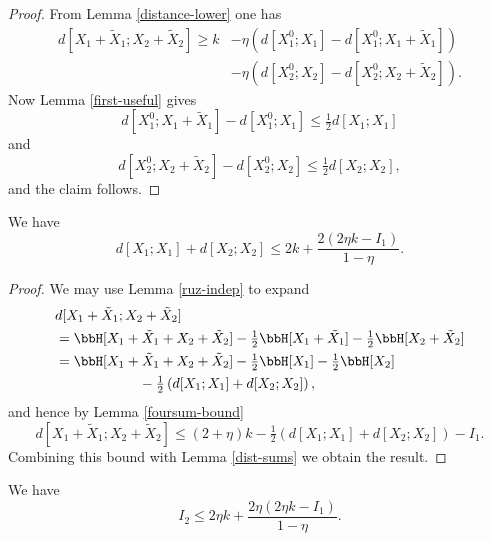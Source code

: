 \begin{proof}\leanok From Lemma \ref{distance-lower} one has
\begin{align*}
    d[X_1+\tilde X_1; X_2+\tilde X_2] \geq k &- \eta(d[X^0_1;X_1] - d[X^0_1;X_1+\tilde X_1]) \\
    &- \eta(d[X^0_2;X_2] - d[X^0_2;X_2+\tilde X_2]).
\end{align*}
Now Lemma \ref{first-useful} gives
$$
d[X^0_1;X_1+\tilde X_1] - d[X^0_1;X_1] \leq \tfrac{1}{2} d[X_1;X_1]$$
and
$$
  d[X^0_2;X_2+\tilde X_2] - d[X^0_2;X_2] \leq \tfrac{1}{2} d[X_2;X_2],
$$
and the claim follows.
\end{proof}

\begin{lemma}\label{second-estimate-aux}\leanok
We have
\[d[X_1;X_1] + d[X_2;X_2] \leq 2 k + \frac{2(2 \eta k - I_1)}{1-\eta}. \]
\end{lemma}
\begin{proof}
\leanok
We may use Lemma \ref{ruz-indep} to expand
  \begin{align*}
   & d[X_1+\tilde X_1;X_2+\tilde X_2] \\ &= \bbH[X_1+\tilde X_1 + X_2 + \tilde X_2]  - \tfrac{1}{2} \bbH[X_1+\tilde X_1] - \tfrac{1}{2} \bbH[X_2+\tilde X_2] \\
    &= \bbH[X_1+\tilde X_1 + X_2 + \tilde X_2]  - \tfrac{1}{2} \bbH[X_1] - \tfrac{1}{2} \bbH[X_2]  \\ & \qquad\qquad\qquad   - \tfrac{1}{2} \left( d[X_1;X_1] + d[X_2; X_2] \right),
  \end{align*}
  and hence by Lemma \ref{foursum-bound}
  \[
    d[X_1+\tilde X_1; X_2+\tilde X_2] \leq (2+\eta) k - \tfrac{1}{2} \left( d[X_1;X_1] + d[X_2;X_2] \right) - I_1.
  \]
  Combining this bound with Lemma \ref{dist-sums} we obtain
  the result.
\end{proof}

\begin{lemma}\label{second-estimate}
  \leanok
We have
$$ I_2 \leq 2 \eta k + \frac{2 \eta (2 \eta k - I_1)}{1 - \eta}.$$
\end{lemma}

